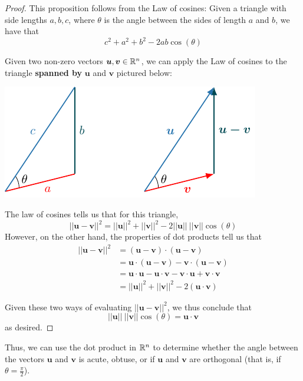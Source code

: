 \begin{proof}

This proposition follows from the Law of cosines:  Given a triangle with side lengths $a, b, c$, where $\theta$ is the angle between the sides of length $a$ and $b$, we have that $$c^2 + a^2 + b^2 - 2ab\cos(\theta)$$

Given two non-zero vectors $\bm{u}, \bm{v} \in \mathbb{R}^n$, we can apply the Law of cosines to the triangle \textbf{spanned by} $\bm{u}$ and $\bm{v}$ pictured below:


 \begin{center}        
        \includegraphics{chapters/1-LinearAlgebra/figures/figures-triangleinequality.pdf}
    \end{center}

The law of cosines tells us that for this triangle, $$||\bm{u-v}||^2 = ||\bm{u}||^2+||\bm{v}||^2 -2||\bm{u}||\ ||\bm{v}||\cos(\theta)$$
However, on the other hand, the properties of dot products tell us that
\begin{align*}
    ||\bm{u-v}||^2 &= (\bm{u-v}) \cdot (\bm{u-v}) \\
    &= \bm{u} \cdot (\bm{u-v}) - \bm{v} \cdot (\bm{u-v}) \\
    &= \bm{u} \cdot \bm{u} - \bm{u} \cdot \bm{v} - \bm{v} \cdot \bm{u} + \bm{v} \cdot \bm{v}  \\
    &= ||\bm{u}||^2+||\bm{v}||^2 -2(\bm{u} \cdot \bm{v})
\end{align*}

Given these two ways of evaluating $||\bm{u-v}||^2$, we thus conclude that $$||\bm{u}||\ ||\bm{v}||\cos(\theta) = \bm{u} \cdot \bm{v}$$ as desired.

\end{proof}


Thus, we can use the dot product in $\mathbb{R}^n$ to determine whether the angle between the vectors $\bm{u}$ and $\bm{v}$ is acute, obtuse, or if $\bm{u}$ and $\bm{v}$ are orthogonal (that is, if $\theta = \frac{\pi}{2}$).


